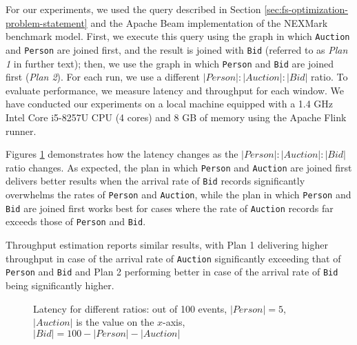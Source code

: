 \label {sec:fs-optimization-experiments}

For our experiments, we used the query described in Section \ref{sec:fs-optimization-problem-statement} and the Apache Beam implementation of the NEXMark benchmark model. First, we execute this query using the graph in which \texttt{Auction} and \texttt{Person} are joined first, and the result is joined with \texttt{Bid} (referred to as \textit{Plan 1} in further text); then, we use the graph in which \texttt{Person} and \texttt{Bid} are joined first (\textit{Plan 2}). For each run, we use a different $|Person|:|Auction|:|Bid|$ ratio. To evaluate performance, we measure latency and throughput for each window. We have conducted our experiments on a local machine equipped with a 1.4 GHz Intel Core i5-8257U CPU (4 cores) and 8 GB of memory using the Apache Flink runner. 

Figures \ref{fig:latency_ratio} demonstrates how the latency changes as the $|Person|:|Auction|:|Bid|$ ratio changes. As expected, the plan in which \texttt{Person} and \texttt{Auction} are joined first delivers better results when the arrival rate of \texttt{Bid} records significantly overwhelms the rates of \texttt{Person} and \texttt{Auction}, while the plan in which \texttt{Person} and \texttt{Bid} are joined first works best for cases where the rate of \texttt{Auction} records far exceeds those of \texttt{Person} and \texttt{Bid}. 

Throughput estimation reports similar results, with Plan 1 delivering higher throughput in case of the arrival rate of \texttt{Auction} significantly exceeding that of \texttt{Person} and \texttt{Bid} and Plan 2 performing better in case of the arrival rate of \texttt{Bid} being significantly higher.

\begin{figure}[htbp]
  \centering
  
  \captionsetup{justification=justified}
  \caption{Latency for different ratios: out of 100 events, $|Person| = 5$, $|Auction|$ is the value on the $x$-axis, $|Bid| = 100 - |Person| - |Auction|$}
  \label {fig:latency_ratio}
\end{figure}

